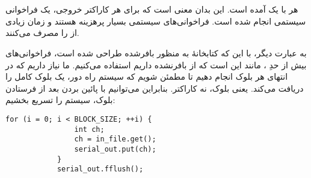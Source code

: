 \section{}
\paragraph{}\label{answer:65}
 هر  با یک  آمده است. این بدان معنی است که برای هر کاراکتر خروجی، یک فراخوانی سیستمی انجام شده است. فراخوانی‌های سیستمی بسیار پرهزینه هستند و زمان زیادی از  را مصرف می‌کنند.

به عبارت دیگر، با این که کتابخانهٔ  به منظور  بافرشده طراحی شده است، فراخوانی‌های بیش از حدِ ، مانند این است که از  بافرنشده داریم استفاده می‌کنیم. ما نیاز داریم که در انتهای هر بلوک  انجام دهیم تا مطمئن شویم که سیستم راه دور، یک بلوک کامل را دریافت می‌کند. یعنی بلوک، نه کاراکتر. بنابراین می‌توانیم با پائین بردن  بعد از فرستادن بلوک، سیستم را تسریع بخشیم:
\begin{LTR}
        \begin{lstlisting}[style=C++Style]
            for (i = 0; i < BLOCK_SIZE; ++i) {
                int ch;
                ch = in_file.get();
                serial_out.put(ch);
            }
            serial_out.fflush();
        \end{lstlisting}
\end{LTR}
